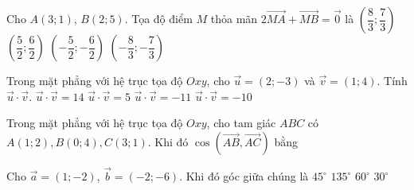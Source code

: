 \begin{ex}%
Cho $A(3;1)$, $B(2;5)$. Tọa độ điểm $M$ thỏa mãn $2 \overrightarrow{MA}+\overrightarrow{MB} = \overrightarrow{0}$ là
\choice
{\True $\left(\dfrac{8}{3};\dfrac{7}{3}\right)$}
{$\left(\dfrac{5}{2};\dfrac{6}{2}\right)$}
{$\left(-\dfrac{5}{2};-\dfrac{6}{2}\right)$}
{$\left(-\dfrac{8}{3};-\dfrac{7}{3}\right)$}
\end{ex}

\begin{ex}%
Trong mặt phẳng với hệ trục tọa độ $Oxy$, cho $\overrightarrow{u}=(2;-3)$ và $\overrightarrow{v}=(1;4)$. Tính $\overrightarrow{u} \cdot \overrightarrow{v}$.
\choice
{$\overrightarrow{u} \cdot \overrightarrow{v}=14$}
{$\overrightarrow{u} \cdot \overrightarrow{v}=5$}
{$\overrightarrow{u} \cdot \overrightarrow{v}=-11$}
{\True $\overrightarrow{u} \cdot \overrightarrow{v}=-10$}
\end{ex}

\begin{ex}%
Trong mặt phẳng với hệ trục tọa độ $Oxy$, cho tam giác $ABC$ có $A(1;2), B(0;4), C(3;1)$. Khi đó $\cos (\overrightarrow{AB}, \overrightarrow{AC})$ bằng
\end{ex}

\begin{ex}%
Cho $\overrightarrow{a} = (1; -2)$, $\overrightarrow{b} = (-2; -6)$. Khi đó góc giữa chúng là
\choice
{\True $45^\circ$}
{$135^\circ$}
{$60^\circ$}
{$30^\circ$}
\end{ex}

